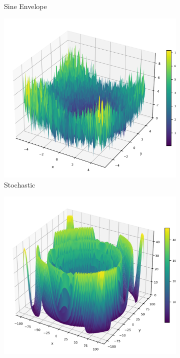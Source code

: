 \begin{figure}[p]
\begin{subfigure}{0.32\textwidth}
        \caption{Sine Envelope}
    \end{subfigure}
    \begin{subfigure}{0.32\textwidth}
        \centering
        \includegraphics[width=1\textwidth]{Figures/benchmark_plots/Stochastic_maximized.png}
        \caption{Stochastic}
    \end{subfigure}
    \begin{subfigure}{0.32\textwidth}
        \centering
        \includegraphics[width=1\textwidth]{Figures/benchmark_plots/StretchedV_maximized.png}

\end{subfigure}
\end{figure}
